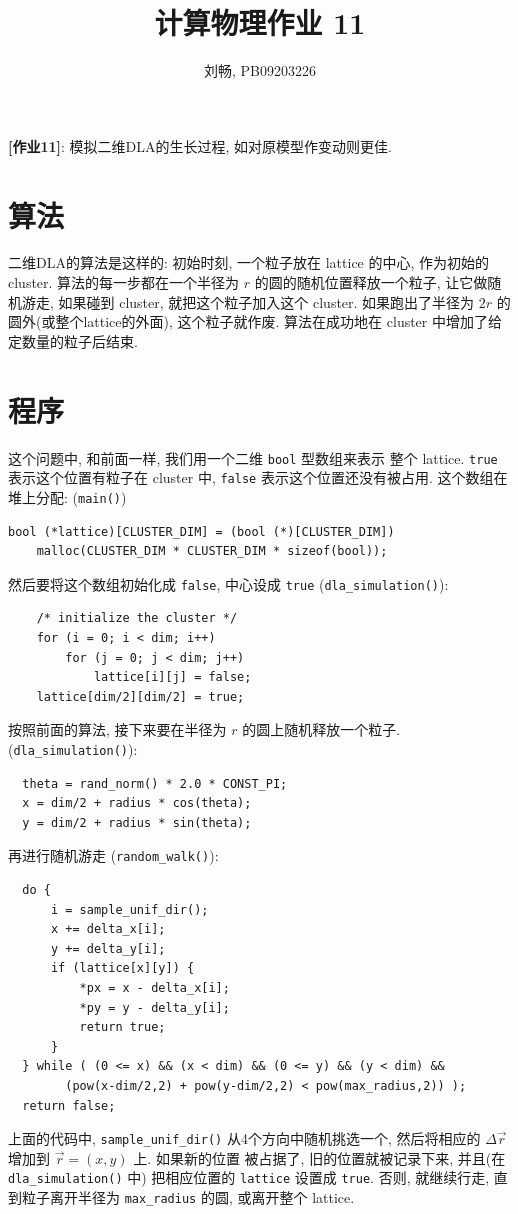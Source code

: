 \documentclass{ctexart}
\begin{document}
\title{计算物理作业 11}
\author{刘畅, PB09203226}
\maketitle

{\bf [作业11]}: 模拟二维DLA的生长过程, 如对原模型作变动则更佳.

\section{算法}
二维DLA的算法是这样的: 初始时刻, 一个粒子放在 lattice 的中心, 作为初始的
cluster. 算法的每一步都在一个半径为 $r$ 的圆的随机位置释放一个粒子,
让它做随机游走, 如果碰到 cluster, 就把这个粒子加入这个 cluster.
如果跑出了半径为 $2r$ 的圆外(或整个lattice的外面), 这个粒子就作废.
算法在成功地在 cluster 中增加了给定数量的粒子后结束.

\section{程序}
这个问题中, 和前面一样, 我们用一个二维 \verb|bool| 型数组来表示
整个 lattice. \verb|true| 表示这个位置有粒子在 cluster 中,
\verb|false| 表示这个位置还没有被占用. 这个数组在堆上分配:
(\verb|main()|)
\begin{verbatim}
bool (*lattice)[CLUSTER_DIM] = (bool (*)[CLUSTER_DIM])
    malloc(CLUSTER_DIM * CLUSTER_DIM * sizeof(bool));
\end{verbatim}
然后要将这个数组初始化成 \verb|false|, 中心设成 \verb|true|
(\verb|dla_simulation()|):
\begin{verbatim}
    /* initialize the cluster */
    for (i = 0; i < dim; i++)
        for (j = 0; j < dim; j++)
            lattice[i][j] = false;
    lattice[dim/2][dim/2] = true;
\end{verbatim}

按照前面的算法, 接下来要在半径为 $r$ 的圆上随机释放一个粒子.
(\verb|dla_simulation()|):
\begin{verbatim}
  theta = rand_norm() * 2.0 * CONST_PI;
  x = dim/2 + radius * cos(theta);
  y = dim/2 + radius * sin(theta);
\end{verbatim}
再进行随机游走 (\verb|random_walk()|):
\begin{verbatim}
  do {
      i = sample_unif_dir();
      x += delta_x[i];
      y += delta_y[i];
      if (lattice[x][y]) {
          *px = x - delta_x[i];
          *py = y - delta_y[i];
          return true;
      }
  } while ( (0 <= x) && (x < dim) && (0 <= y) && (y < dim) &&
        (pow(x-dim/2,2) + pow(y-dim/2,2) < pow(max_radius,2)) );
  return false;
\end{verbatim}
上面的代码中, \verb|sample_unif_dir()| 从4个方向中随机挑选一个,
然后将相应的 $\Delta\vec r$ 增加到 $\vec r=(x,y)$ 上. 如果新的位置
被占据了, 旧的位置就被记录下来, 并且(在 \verb|dla_simulation()| 中)
把相应位置的 \verb|lattice| 设置成 \verb|true|. 否则, 就继续行走,
直到粒子离开半径为 \verb|max_radius| 的圆, 或离开整个 lattice.
\end{document}
